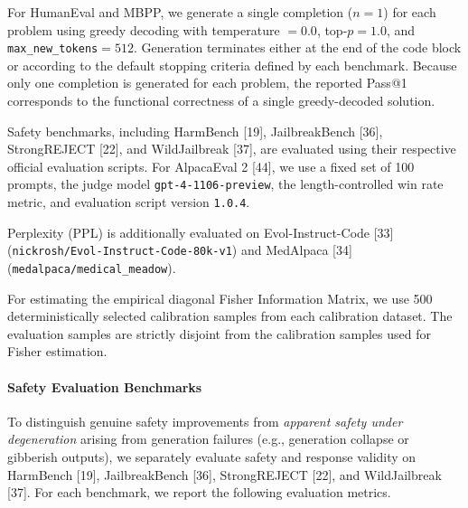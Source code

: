 \documentclass{article}
\begin{document}
For HumanEval and MBPP, we generate a single completion ($n=1$) for each problem using greedy decoding with temperature $=0.0$, top-$p=1.0$, and \texttt{max\_new\_tokens}$=512$. Generation terminates either at the end of the code block or according to the default stopping criteria defined by each benchmark. Because only one completion is generated for each problem, the reported Pass@1 corresponds to the functional correctness of a single greedy-decoded solution.

Safety benchmarks, including HarmBench [19], JailbreakBench [36], StrongREJECT [22], and WildJailbreak [37], are evaluated using their respective official evaluation scripts. For AlpacaEval 2 [44], we use a fixed set of 100 prompts, the judge model \texttt{gpt-4-1106-preview}, the length-controlled win rate metric, and evaluation script version \texttt{1.0.4}.

Perplexity (PPL) is additionally evaluated on Evol-Instruct-Code [33] (\texttt{nickrosh/Evol-Instruct-Code-80k-v1}) and MedAlpaca [34] (\texttt{medalpaca/medical\_meadow}).

For estimating the empirical diagonal Fisher Information Matrix, we use 500 deterministically selected calibration samples from each calibration dataset. The evaluation samples are strictly disjoint from the calibration samples used for Fisher estimation.


\paragraph{Safety Evaluation Benchmarks}

To distinguish genuine safety improvements from \emph{apparent safety under degeneration} arising from generation failures (e.g., generation collapse or gibberish outputs), we separately evaluate safety and response validity on HarmBench [19], JailbreakBench [36], StrongREJECT [22], and WildJailbreak [37]. For each benchmark, we report the following evaluation metrics.
\end{document}
